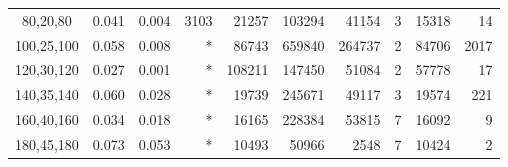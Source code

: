 \documentclass[smallextended]{svjour3hack}       %
\begin{document}
\begin{table}[!ht]
\begin{tabular}{c|r|r|r|r|r|r|r|rr}
80,20,80            & 0.041                                     & 0.004                                & 3103                                        & 21257                                     & 103294                                   & 41154                                     & 3                                       & 15318                                     & 14                                        \\
100,25,100          & 0.058                                     & 0.008                                & *                                           & 86743                                     & 659840                                   & 264737                                    & 2                                       & 84706                                     & 2017                                      \\
120,30,120          & 0.027                                     & 0.001                                & *                                           & 108211                                    & 147450                                   & 51084                                     & 2                                       & 57778                                     & 17                                        \\
140,35,140          & 0.060                                     & 0.028                                & *                                           & 19739                                     & 245671                                   & 49117                                     & 3                                       & 19574                                     & 221                                       \\
160,40,160          & 0.034                                     & 0.018                                & *                                           & 16165                                     & 228384                                   & 53815                                     & 7                                       & 16092                                     & 9                                         \\
180,45,180          & 0.073                                     & 0.053                                & *                                           & 10493                                     & 50966                                    & 2548                                      & 7                                       & 10424                                     & 2                                         \\

\end{tabular}
\end{table}
\end{document}
